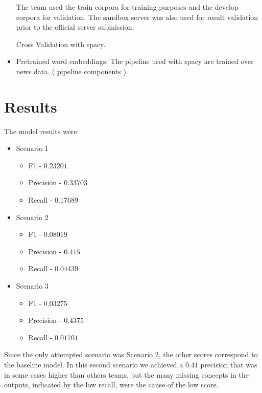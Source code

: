 \documentclass[
]{ceurart}
\begin{document}
\begin{itemize}
    The team used the train corpora for training purposes and the develop corpora for validation. The sandbox server was also used for result validation prior to the official server submission.
    
    Cross Validation with spacy.
    
    \item Pretrained word embeddings. \newline
    The pipeline used with spacy are trained over news data. ( pipeline components ).
    
\end{itemize}

\section{Results}

The model results were:
\begin{itemize}
    \item Scenario 1 \newline
    \begin{itemize}
        \item F1 - $0.23201$ 
        \item Precision - $0.33703$
        \item Recall - $0.17689$                                    
    \end{itemize}
    \item Scenario 2 \newline
    \begin{itemize}
        \item F1 - $0.08019$
        \item Precision - $0.415$
        \item Recall - $0.04439$
    \end{itemize}
    \item Scenario 3 \newline
    \begin{itemize}
        \item F1 - $0.03275$
        \item Precision - $0.4375$
        \item Recall - $0.01701$
    \end{itemize}
\end{itemize}

Since the only attempted scenario was Scenario 2, the other scores correspond to the baseline model. In this second scenario we achieved a $0.41$ precision that was in some cases higher than others teams, but the many missing concepts in the outputs, indicated by the low recall, were the cause of the low score. 
\end{document}
